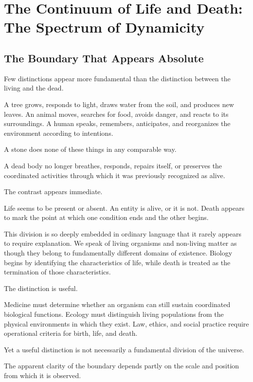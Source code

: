 

\section{The Continuum of Life and Death: The Spectrum of Dynamicity}

\subsection*{\textbf{The Boundary That Appears Absolute}}


Few distinctions appear more fundamental than the distinction between the living and the dead.

A tree grows, responds to light, draws water from the soil, and produces new leaves. An animal moves, searches for food, avoids danger, and reacts to its surroundings. A human speaks, remembers, anticipates, and reorganizes the environment according to intentions.

A stone does none of these things in any comparable way.

A dead body no longer breathes, responds, repairs itself, or preserves the coordinated activities through which it was previously recognized as alive.

The contrast appears immediate.

Life seems to be present or absent. An entity is alive, or it is not. Death appears to mark the point at which one condition ends and the other begins.

This division is so deeply embedded in ordinary language that it rarely appears to require explanation. We speak of living organisms and non-living matter as though they belong to fundamentally different domains of existence. Biology begins by identifying the characteristics of life, while death is treated as the termination of those characteristics.

The distinction is useful.

Medicine must determine whether an organism can still sustain coordinated biological functions. Ecology must distinguish living populations from the physical environments in which they exist. Law, ethics, and social practice require operational criteria for birth, life, and death.

Yet a useful distinction is not necessarily a fundamental division of the universe.

The apparent clarity of the boundary depends partly on the scale and position from which it is observed.

